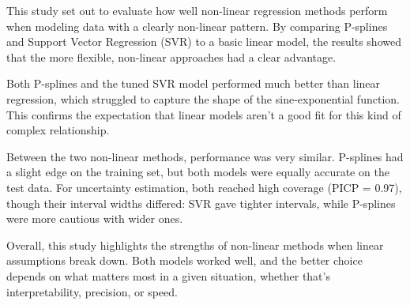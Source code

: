 \documentclass[8pt,twocolumn]{article}
\begin{document}
This study set out to evaluate how well non-linear regression methods perform when modeling data with a clearly non-linear pattern. By comparing P-splines and Support Vector Regression (SVR) to a basic linear model, the results showed that the more flexible, non-linear approaches had a clear advantage.

Both P-splines and the tuned SVR model performed much better than linear regression, which struggled to capture the shape of the sine-exponential function. This confirms the expectation that linear models aren't a good fit for this kind of complex relationship.

Between the two non-linear methods, performance was very similar. P-splines had a slight edge on the training set, but both models were equally accurate on the test data. For uncertainty estimation, both reached high coverage (PICP = 0.97), though their interval widths differed: SVR gave tighter intervals, while P-splines were more cautious with wider ones.

Overall, this study highlights the strengths of non-linear methods when linear assumptions break down. Both models worked well, and the better choice depends on what matters most in a given situation, whether that's interpretability, precision, or speed.



\end{document}
